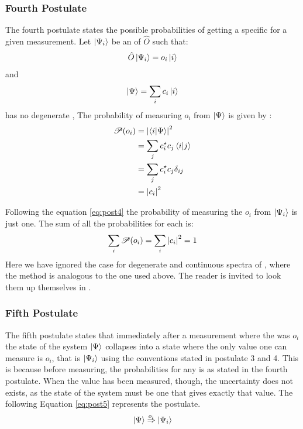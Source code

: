 \documentclass[../master_thesis.tex]{subfiles}
\begin{document}
\subsubsection{Fourth Postulate}
The fourth postulate states the possible probabilities of getting a specific
\eival for a given measurement.
Let $\ket{\Psi_i}$ be an \eifunc of $\hat{O}$ such that:
\begin{equation}
  \hat{O}\ket{\Psi_i} = o_i\ket{i}
\end{equation}
and
\begin{equation}
  \ket{\Psi} = \sum_i c_i \ket{i} \label{eq:lincomb}
\end{equation}
has no degenerate \eival,
The probability of measuring \eival  $o_i$ from $\ket{\Psi}$ is given by
\cite{Cohen:1973}:
\begin{align} \label{eq:post4}
  \begin{split}
    \mathscr{P}(o_i) &= \abs{\braket{i|\Psi}}^2\\
                     &= \sum_{j}c_i^\star c_j\braket{i|j}\\
                     &= \sum_{j}c_i^\star c_j\delta_{ij}\\
                     &= \abs{c_i}^2
  \end{split}
\end{align}

Following the equation \ref{eq:post4} the probability of measuring the
\eival $o_i$ from $\ket{\Psi_i}$ is just one. The sum of all the probabilities
for each \eival is:
\begin{equation}
  \sum_i\mathscr{P}(o_i) = \sum_i \abs{c_i}^2 = 1
\end{equation}
Here we have ignored the case for degenerate \eival and continuous spectra of
\eival, where the method is analogous to the one used above. The reader is
invited to look them up themselves in \cite{Cohen:1973, Atkins:2011}.

\subsubsection{Fifth Postulate}
The fifth postulate states that immediately after a measurement where the \eival was $o_i$
the state of the system $\ket{\Psi}$ collapses into a state where the only value one
can measure is $o_i$, that is $ \ket{\Psi_i} $ using the conventions stated in postulate 3 and 4.
This is because before measuring, the probabilities for any \eival
is as stated in the fourth postulate. When the value has been measured, though,
the uncertainty does not exists, as the state of the system must be one that gives
exactly that value. The following Equation \ref{eq:post5} represents the postulate.
\begin{equation}\label{eq:post5}
  \ket{\Psi} \stackrel{o_i}{\Rightarrow} \ket{\Psi_i}
\end{equation}
\end{document}
